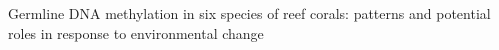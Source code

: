 Germline DNA methylation in six species of reef corals: patterns and potential roles in response to environmental change 
